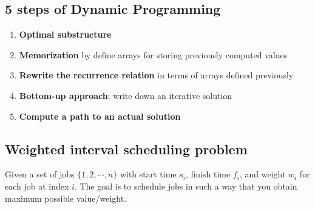 \documentclass[11pt]{article}
\begin{document}
\subsection*{5 steps of Dynamic Programming}

\begin{enumerate}
    \item \textbf{Optimal substructure}
    \item \textbf{Memorization} by define arrays for storing previously computed values
    \item \textbf{Rewrite the recurrence relation} in terms of arrays defined previously
    \item \textbf{Bottom-up approach}: write down an iterative solution
    \item \textbf{Compute a path to an actual solution}
\end{enumerate}


\subsection*{Weighted interval scheduling problem}

Given a set of jobs $\{ 1, 2, \cdots, n \}$ with start time $s_i$, finish time $f_i$, and weight $w_i$ for each job at index $i$. The goal is to schedule jobs in such a way that you obtain maximum possible value/weight.
\end{document}
